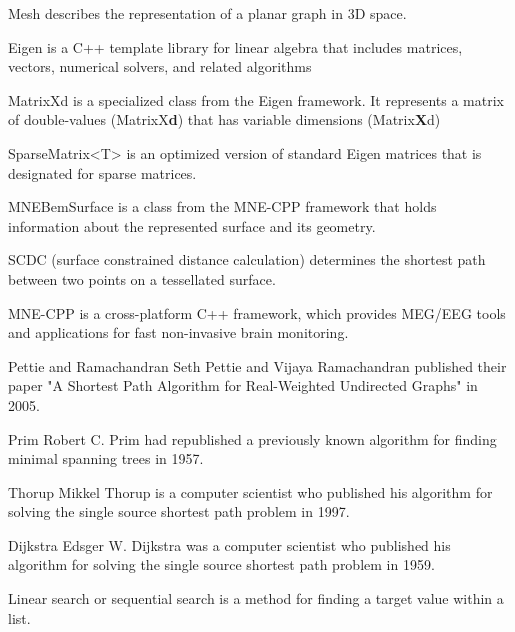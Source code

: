 \begin{aims}
	
	\item[Mesh] describes the representation of a planar graph in 3D space.
	\item[Eigen] is a C++ template library for linear algebra that includes matrices, vectors, numerical solvers, and related algorithms
	\item[MatrixXd] is a specialized class from the Eigen framework. It represents a matrix of double-values (MatrixX\textbf{d}) that has variable dimensions (Matrix\textbf{X}d)
	\item[SparseMatrix<T>] is an optimized version of standard Eigen matrices that is designated for sparse matrices.
	\item[MNEBemSurface] is a class from the MNE-CPP framework that holds information about the represented surface and its geometry.
	\item [SCDC] (surface constrained distance calculation) determines the shortest path between two points on a tessellated surface.
	\item [MNE-CPP] is a cross-platform C++ framework, which provides MEG/EEG tools and applications for fast non-invasive brain monitoring.
	\item[Pettie and Ramachandran] Seth Pettie and Vijaya Ramachandran published their paper "A Shortest Path Algorithm for Real-Weighted Undirected Graphs" in 2005.
	\item[Prim] Robert C. Prim had republished a previously known algorithm for finding minimal spanning trees in 1957.
	\item[Thorup] Mikkel Thorup is a computer scientist who published his algorithm for solving the single source shortest path problem in 1997.
	\item[Dijkstra] Edsger W. Dijkstra was a computer scientist who published his algorithm for solving the single source shortest path problem in 1959.
	\item [Linear search] or sequential search is a method for finding a target value within a list.
\end{aims}
  

